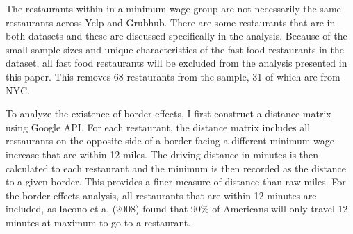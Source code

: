 \documentclass[11pt]{article}
\begin{document}
The restaurants within in a minimum wage group are not necessarily the same restaurants across Yelp and Grubhub.  There are some restaurants that are in both datasets and these are discussed specifically in the analysis. Because of the small sample sizes and unique characteristics of the fast food restaurants in the dataset, all fast food restaurants will be excluded from the analysis presented in this paper. This removes 68 restaurants from the sample, 31 of which are from NYC. 

To analyze the existence of border effects, I first construct a distance matrix using Google API. For each restaurant, the distance matrix includes all restaurants on the opposite side of a border facing a different minimum wage increase that are within 12 miles. The driving distance in minutes is then calculated to each restaurant and the minimum is then recorded as the distance to a given border. This provides a finer measure of distance than raw miles. For the border effects analysis, all restaurants that are within 12 minutes are included, as Iacono et a. (2008) found that 90\% of Americans will only travel 12 minutes at maximum to go to a restaurant\nocite{drivingtime}.





\end{document}
